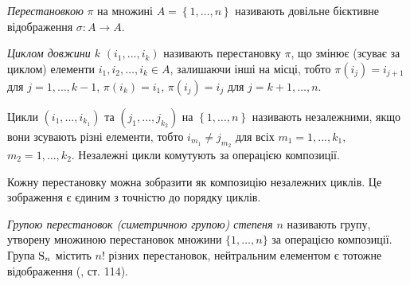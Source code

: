 \begin{definition}
    \emph{Перестановкою} $\pi$ на множині $A = \left\{1,\dots,n\right\}$
    називають довільне бієктивне відображення $\sigma: A \to A$.
\end{definition}
\begin{definition}
    \emph{Циклом довжини $k$} $\left(i_1, ..., i_k\right)$ називають перестановку $\pi$, що змінює
    (зсуває за циклом) елементи $i_1, i_2, \dots, i_k \in A$, залишаючи
    інші на місці, тобто $\pi(i_{j}) = i_{j+1}$ для $j=1,\dots,k-1$,
    $\pi(i_k) = i_1$, $\pi(i_j) = i_j$ для $j = k+1, \dots, n$. 
\end{definition}
\begin{definition}
    Цикли $\left(i_1, ..., i_{k_1}\right)$ та $\left(j_1, ..., j_{k_2}\right)$ 
    на $\left\{1,\dots,n\right\}$ називають незалежними, 
    якщо вони зсувають різні елементи, тобто
    $i_{m_1} \neq j_{m_2}$ для всіх $m_1 = 1,...,k_1$, $m_2 = 1,...,k_2$.
    Незалежні цикли комутують за операцією композиції.
\end{definition}
\begin{theorem}\label{th:perm_decomposition}
    Кожну перестановку можна зобразити як композицію
    незалежних циклів. Це зображення є єдиним з точністю до
    порядку циклів.
\end{theorem}
\begin{definition}
    \emph{Групою перестановок (симетричною групою) степеня $n$}
    називають групу, утворену множиною перестановок
    множини $\{1, \dots, n\}$ за операцією композиції.
    Група $\mathrm{S}_{n}$ містить $n!$ різних перестановок, нейтральним елементом є
    тотожне відображення (\cite{Spectorsky}, ст. 114).
\end{definition}